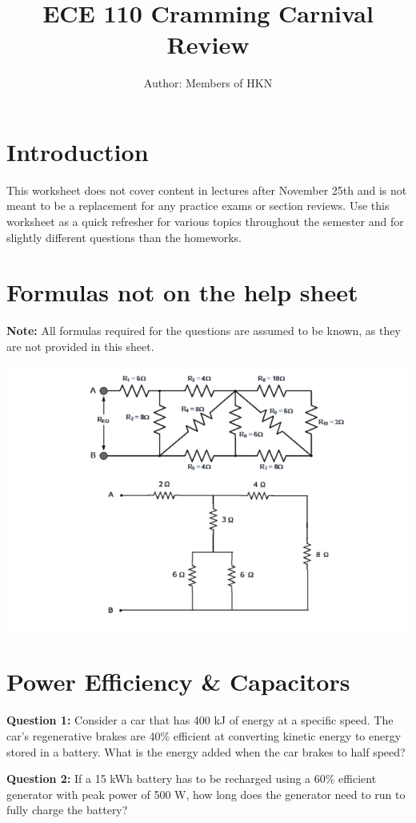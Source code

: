 \documentclass{article}
\begin{document}
\title{ECE 110 Cramming Carnival Review}
\author{Author: Members of HKN}
\date{}
\maketitle

\section*{Introduction}
This worksheet does not cover content in lectures after November 25th and is not meant to be a replacement for any practice exams or section reviews. Use this worksheet as a quick refresher for various topics throughout the semester and for slightly different questions than the homeworks.

\section*{Formulas not on the help sheet}
\textbf{Note:} All formulas required for the questions are assumed to be known, as they are not provided in this sheet.
\begin{center}
    \includegraphics[width=0.75\linewidth]{figures/image.png}
\end{center}
\newpage

\section*{Power Efficiency \& Capacitors}
\textbf{Question 1:} Consider a car that has 400 kJ of energy at a specific speed. The car's regenerative brakes are 40\% efficient at converting kinetic energy to energy stored in a battery. What is the energy added when the car brakes to half speed?



\textbf{Question 2:} If a 15 kWh battery has to be recharged using a 60\% efficient generator with peak power of 500 W, how long does the generator need to run to fully charge the battery?
\end{document}
